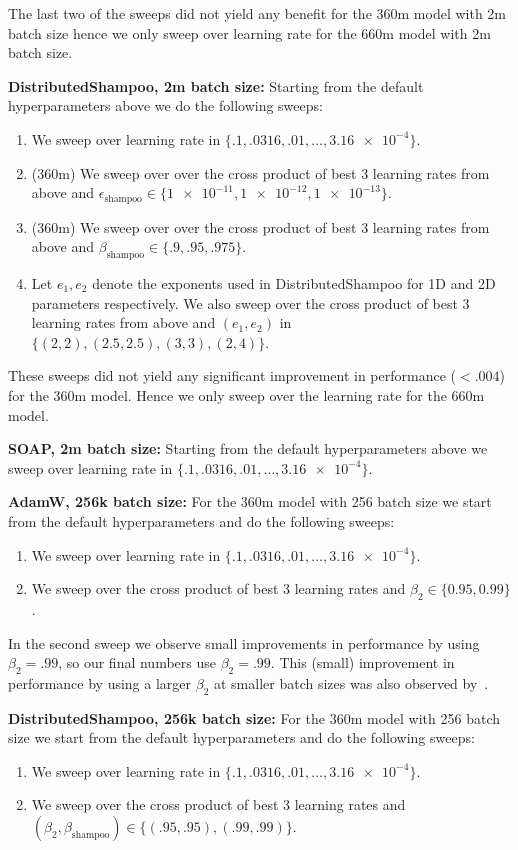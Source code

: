 \documentclass{article}
\def\eps{{\epsilon}}
\begin{document}
The last two of the sweeps did not yield any benefit for the 360m model with 2m batch size hence we only sweep over learning rate for the 660m model with 2m batch size. 

\textbf{DistributedShampoo, 2m batch size:} Starting from the default hyperparameters above we do the following sweeps:
\begin{enumerate}
    \item We sweep over learning rate in $\{.1, .0316, .01,\ldots, \num{3.16e-4}\}$.
    \item (360m) We sweep over over the cross product of best 3 learning rates from above and $\eps_{\text{shampoo}} \in \{\num{1e-11}, \num{1e-12}, \num{1e-13}\}$.
    \item (360m) We sweep over over the cross product of best 3 learning rates from above and $\beta_{\text{shampoo}} \in \{.9, .95, .975\}$.
    \item Let $e_1, e_2$ denote the exponents used in DistributedShampoo for 1D and 2D parameters respectively. We also sweep over the cross product of best 3 learning rates from above and $(e_1, e_2)$ in $\{(2, 2), (2.5, 2.5), (3, 3), (2, 4)\}$.
\end{enumerate}

These sweeps did not yield any significant improvement in performance ($<.004$) for the 360m model. Hence we only sweep over the learning rate for the 660m model.

\textbf{SOAP, 2m batch size:} Starting from the default hyperparameters above we sweep over learning rate in $\{.1, .0316, .01,\ldots, \num{3.16e-4}\}$.

\textbf{AdamW, 256k batch size:}
For the 360m model with 256 batch size we start from the default hyperparameters and do the following sweeps:
\begin{enumerate}
    \item We sweep over learning rate in $\{.1, .0316, .01,\ldots, \num{3.16e-4}\}$.
    \item We sweep over the cross product of best 3 learning rates and $\beta_2 \in \{0.95,0.99\}$.
\end{enumerate}

In the second sweep we observe small improvements in performance by using $\beta_2 = .99$, so our final numbers use $\beta_2 = .99$. This (small) improvement in performance by using a larger $\beta_2$ at smaller batch sizes was also observed by~\citet{porian,zhaoscience}.

\textbf{DistributedShampoo, 256k batch size:}
For the 360m model with 256 batch size we start from the default hyperparameters and do the following sweeps:
\begin{enumerate}
    \item We sweep over learning rate in $\{.1, .0316, .01,\ldots, \num{3.16e-4}\}$.
    \item We sweep over the cross product of best 3 learning rates and $(\beta_2, \beta_{\text{shampoo}}) \in \{(.95, .95), (.99, .99)\}$.
\end{enumerate}
\end{document}
